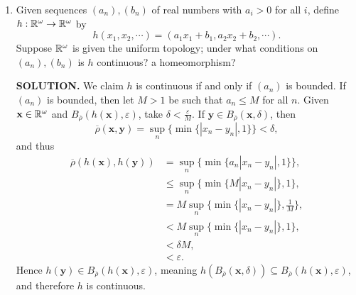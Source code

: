 \documentclass{article}
\begin{document}
\begin{enumerate}
\begin{enumerate}
        {\bf SOLUTION.} If $\mathbf{y} \in B_{\overline{\rho}}(\mathbf{x}, \varepsilon)$, then let $\delta$ be such that
        $$\sup_n \{\overline{d}(x_n, y_n) \} < \delta < \varepsilon.$$
        Since $|y_n - x_n| < \delta$ for each $n$, $\mathbf{y} \in U(\mathbf{x}, \delta) \subseteq \bigcup_{0 < \delta < \varepsilon} U(\mathbf{x}, \delta)$. Conversely, if $\mathbf{y} \in \bigcup_{0 < \delta < \varepsilon} U(\mathbf{x}, \delta)$ then there exists $0 < \delta < \varepsilon$ such that $\mathbf{y} \in U(\mathbf{x}, \delta)$. It follows that $y_n \in (x_n - \delta, x_n + \delta)$ for each $n$, or equivalently, $|y_n - x_n| < \delta < \varepsilon$. Hence $\sup_n \{\overline{d}(x_n, y_n)\} < \varepsilon$, implying that $\mathbf{y} \in B_{\overline{\rho}}(\mathbf{x}, \varepsilon)$. $\Box$
    \end{enumerate}

    \item Given sequences $(a_n), (b_n)$ of real numbers with $a_i > 0$ for all $i$, define $h: \mathbb{R}^\omega \rightarrow \mathbb{R}^\omega$ by
    $$h(x_1, x_2, \cdots) = (a_1x_1+b_1, a_2x_2+b_2, \cdots).$$
    Suppose $\mathbb{R}^\omega$ is given the uniform topology; under what conditions on $(a_n), (b_n)$ is $h$ continuous? a homeomorphism?

    {\bf SOLUTION.} We claim $h$ is continuous if and only if $(a_n)$ is bounded. If $(a_n)$ is bounded, then let $M > 1$ be such that $a_n \leq M$ for all $n$. Given $\mathbf{x} \in \mathbb{R}^\omega$ and $B_{\overline{\rho}}(h(\mathbf{x}), \varepsilon)$, take $\delta < \frac{\varepsilon}{M}$. If $\mathbf{y} \in B_{\overline{\rho}}(\mathbf{x}, \delta)$, then
    $$\overline{\rho}(\mathbf{x}, \mathbf{y}) = \sup_n \{\min\{|x_n - y_n|, 1\}\} < \delta,$$
    and thus
    \begin{align*}
        \overline{\rho}(h(\mathbf{x}), h(\mathbf{y})) &= \sup_n \{\min\{a_n|x_n - y_n|, 1\}\}, \\
        &\leq \sup_n \{\min \{M|x_n - y_n|\}, 1\}, \\
        &= M\sup_n \{\min \{|x_n - y_n|\}, \frac1M\}, \\
        &< M\sup_n \{\min \{|x_n - y_n|\}, 1\}, \\
        &< \delta M, \\
        &< \varepsilon.
    \end{align*}
    Hence $h(\mathbf{y}) \in B_{\overline{\rho}}(h(\mathbf{x}), \varepsilon)$, meaning $h(B_{\overline{\rho}}(\mathbf{x}, \delta)) \subseteq B_{\overline{\rho}}(h(\mathbf{x}), \varepsilon)$, and therefore $h$ is continuous.


\end{enumerate}
\end{document}
